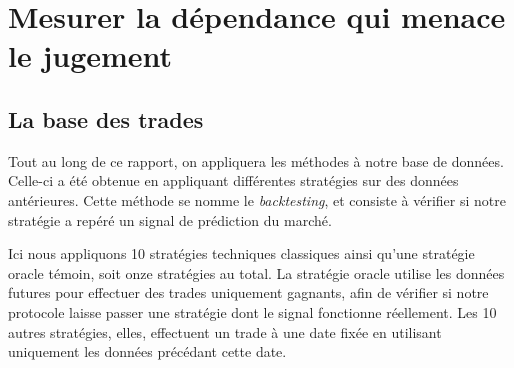 \chapter{Mesurer la dépendance qui menace le jugement}
\label{chap:donnees}

\section{La base des trades}
\label{sec:donnees-trades}


Tout au long de ce rapport, on appliquera les méthodes à notre base
de données. Celle-ci a été obtenue en appliquant différentes stratégies
sur des données antérieures. Cette méthode se nomme le \emph{backtesting}, et
consiste à vérifier si notre stratégie a repéré un signal de prédiction
du marché.

Ici nous appliquons 10 stratégies techniques classiques ainsi qu'une stratégie
oracle témoin, soit onze stratégies au total.
La stratégie oracle utilise les données futures pour effectuer des
trades uniquement gagnants, afin de vérifier si notre protocole laisse passer
une stratégie dont le signal fonctionne réellement.
Les 10 autres stratégies, elles, effectuent un trade à une date fixée en
utilisant uniquement les données précédant cette date. 

